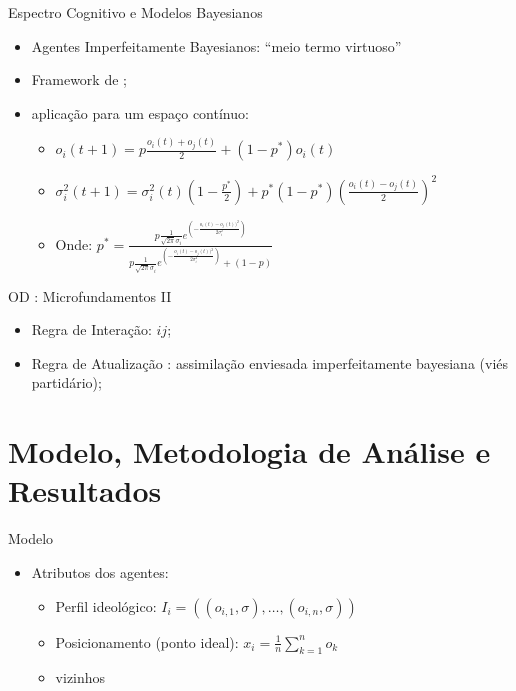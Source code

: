\documentclass{beamer}
\begin{document}
\begin{frame}{Espectro Cognitivo e Modelos Bayesianos}
  \begin{itemize}
  \item Agentes Imperfeitamente Bayesianos: ``meio termo virtuoso''
  \item Framework de \textcite{martins2012bayesian};
  \item \textcite{martins2009bayesian} aplicação para um espaço contínuo:
    \begin{itemize}
    \item    \( o_i(t+1)
    =
    p
    \frac{o_i(t) + o_j(t)}{2}
    +
    (1-p^*)o_i(t) \)
    \item \(    \sigma_i^2(t+1)
    =
    \sigma_i^2(t)
    (1 - \frac{p^*}{2})
    +
    p^*
    (1-p^*)
    (\frac{o_i(t)-o_j(t)}{2})^2\)
    \vspace{0.3cm}
    \item Onde: \(
    p^*
    =
    \frac{
      p \frac{1}{\sqrt{2 \pi} \sigma_i}
      e^{(- \frac{o_i (t) - o_j (t))^2}{2 \sigma_i^2})}
    }{
      p
      \frac{1}{\sqrt{2 \pi} \sigma_i}
    e^{(- \frac{o_i (t) - o_j (t))^2}{2 \sigma_i^2})}
    +
    (1 - p)
  }
  \) 
  \end{itemize}
  \end{itemize}
\end{frame}

\begin{frame}{OD : Microfundamentos II}
  \begin{itemize}
  \item Regra de Interação: \(ij\);
  \item Regra de Atualização : assimilação enviesada imperfeitamente bayesiana
    (viés partidário);
  \end{itemize}
\end{frame}

\section{Modelo, Metodologia de Análise e Resultados}
\begin{frame}{Modelo}
  \begin{itemize}
  \item Atributos dos agentes:
    \begin{itemize}
    \item Perfil ideológico: \( I_i = ((o_{i,1},\sigma), \ldots,
      (o_{i,n}, \sigma) )\)
    \item Posicionamento (ponto ideal):  \(x_i = \frac{1}{n}\sum_{k=1}^{n}
      o_k\)
      \item \textcolor{gray!70}{vizinhos}
    \end{itemize}
  \end{itemize}
\end{frame}
\end{document}

